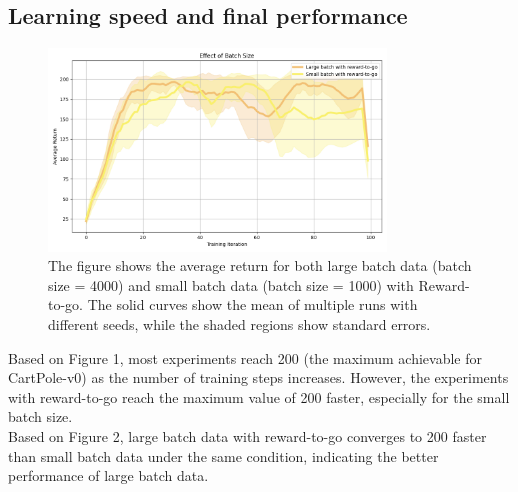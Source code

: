 \documentclass{article} %
\begin{document}
\subsection{Learning speed and final performance}
\begin{figure}[h]
\centering
\includegraphics[width=0.8\textwidth]{cartpole_comparison_batchsize.png}
\caption{The figure shows the average return for both large batch data (batch size = 4000) and small batch data (batch size = 1000) with Reward-to-go. The solid curves show the mean of multiple runs with different seeds, while the shaded regions show standard errors.}
\label{fig:batch size}
\end{figure}

Based on Figure 1, most experiments reach 200 (the maximum achievable for CartPole-v0) as the number of training steps increases. However, the experiments with reward-to-go reach the maximum value of 200 faster, especially for the small batch size. \\
Based on Figure 2, large batch data with reward-to-go converges to 200 faster than small batch data under the same condition, indicating the better performance of large batch data.  





\end{document}
